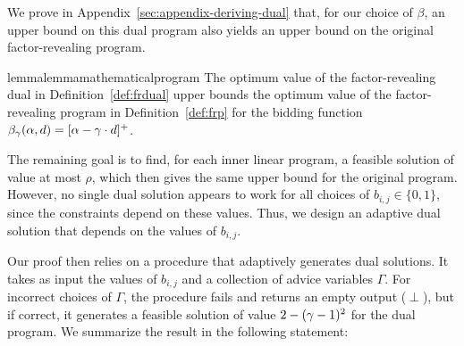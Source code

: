 We prove in Appendix~\ref{sec:appendix-deriving-dual} that, for our choice of $\beta$, an upper bound on this dual program also yields an upper bound on the original factor-revealing program.
\begin{restatable}{lemma}{lemmamathematicalprogram}\label{lemma:mathematical-program-1.99}
    The optimum value of the factor-revealing dual in Definition~\ref{def:frdual} upper bounds the optimum value of the factor-revealing program in Definition~\ref{def:frp} for the bidding function $\beta_{\gamma}(\alpha, d) = [\alpha - \gamma \cdot d]^+$.
\end{restatable}


The remaining goal is to find, for each inner linear program, a feasible solution of value at most $\rho$, which then gives the same upper bound for the original program. However, no single dual solution appears to work for all choices of $b_{i,j}\in\{0,1\}$, since the constraints depend on these values. 
Thus, we design an adaptive dual solution that depends on the values of $b_{i,j}$.

Our proof then relies on a procedure that adaptively generates dual solutions. It takes as input the values of $b_{i,j}$ and a collection of advice variables $\Gamma$.  
For incorrect choices of $\Gamma$, the procedure fails and returns an empty output ($\perp$), but if correct, it generates a feasible solution of value $2-(\gamma-1)^2$ for the dual program.
We summarize the result in the following statement:


